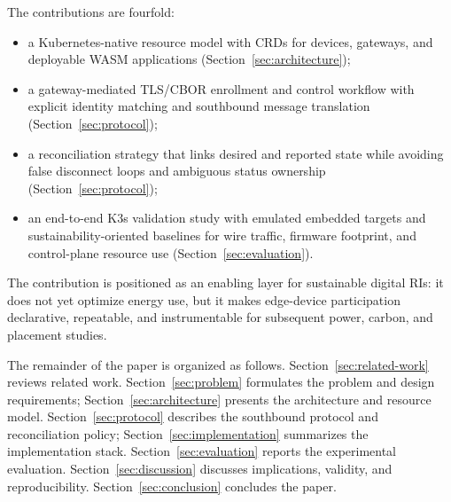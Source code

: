 The contributions are fourfold:
\begin{itemize}[leftmargin=*,nosep]
    \item a Kubernetes-native resource model with CRDs for devices, gateways, and deployable WASM applications (Section~\ref{sec:architecture});
    \item a gateway-mediated TLS/CBOR enrollment and control workflow with explicit identity matching and southbound message translation (Section~\ref{sec:protocol});
    \item a reconciliation strategy that links desired and reported state while avoiding false disconnect loops and ambiguous status ownership (Section~\ref{sec:protocol});
    \item an end-to-end K3s validation study with emulated embedded targets and sustainability-oriented baselines for wire traffic, firmware footprint, and control-plane resource use (Section~\ref{sec:evaluation}).
\end{itemize}
The contribution is positioned as an enabling layer for sustainable digital RIs: it does not yet optimize energy use, but it makes edge-device participation declarative, repeatable, and instrumentable for subsequent power, carbon, and placement studies.

The remainder of the paper is organized as follows. Section~\ref{sec:related-work} reviews related work. Section~\ref{sec:problem} formulates the problem and design requirements; Section~\ref{sec:architecture} presents the architecture and resource model. Section~\ref{sec:protocol} describes the southbound protocol and reconciliation policy; Section~\ref{sec:implementation} summarizes the implementation stack. Section~\ref{sec:evaluation} reports the experimental evaluation. Section~\ref{sec:discussion} discusses implications, validity, and reproducibility. Section~\ref{sec:conclusion} concludes the paper.
